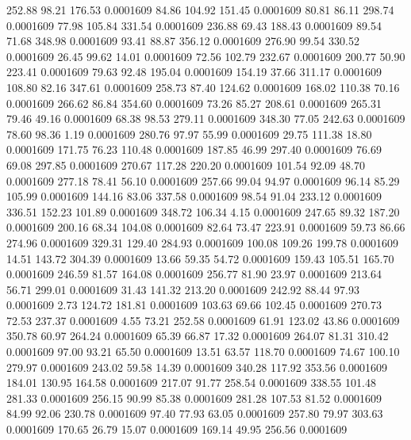  252.88   98.21  176.53   0.0001609
  84.86  104.92  151.45   0.0001609
  80.81   86.11  298.74   0.0001609
  77.98  105.84  331.54   0.0001609
 236.88   69.43  188.43   0.0001609
  89.54   71.68  348.98   0.0001609
  93.41   88.87  356.12   0.0001609
 276.90   99.54  330.52   0.0001609
  26.45   99.62   14.01   0.0001609
  72.56  102.79  232.67   0.0001609
 200.77   50.90  223.41   0.0001609
  79.63   92.48  195.04   0.0001609
 154.19   37.66  311.17   0.0001609
 108.80   82.16  347.61   0.0001609
 258.73   87.40  124.62   0.0001609
 168.02  110.38   70.16   0.0001609
 266.62   86.84  354.60   0.0001609
  73.26   85.27  208.61   0.0001609
 265.31   79.46   49.16   0.0001609
  68.38   98.53  279.11   0.0001609
 348.30   77.05  242.63   0.0001609
  78.60   98.36    1.19   0.0001609
 280.76   97.97   55.99   0.0001609
  29.75  111.38   18.80   0.0001609
 171.75   76.23  110.48   0.0001609
 187.85   46.99  297.40   0.0001609
  76.69   69.08  297.85   0.0001609
 270.67  117.28  220.20   0.0001609
 101.54   92.09   48.70   0.0001609
 277.18   78.41   56.10   0.0001609
 257.66   99.04   94.97   0.0001609
  96.14   85.29  105.99   0.0001609
 144.16   83.06  337.58   0.0001609
  98.54   91.04  233.12   0.0001609
 336.51  152.23  101.89   0.0001609
 348.72  106.34    4.15   0.0001609
 247.65   89.32  187.20   0.0001609
 200.16   68.34  104.08   0.0001609
  82.64   73.47  223.91   0.0001609
  59.73   86.66  274.96   0.0001609
 329.31  129.40  284.93   0.0001609
 100.08  109.26  199.78   0.0001609
  14.51  143.72  304.39   0.0001609
  13.66   59.35   54.72   0.0001609
 159.43  105.51  165.70   0.0001609
 246.59   81.57  164.08   0.0001609
 256.77   81.90   23.97   0.0001609
 213.64   56.71  299.01   0.0001609
  31.43  141.32  213.20   0.0001609
 242.92   88.44   97.93   0.0001609
   2.73  124.72  181.81   0.0001609
 103.63   69.66  102.45   0.0001609
 270.73   72.53  237.37   0.0001609
   4.55   73.21  252.58   0.0001609
  61.91  123.02   43.86   0.0001609
 350.78   60.97  264.24   0.0001609
  65.39   66.87   17.32   0.0001609
 264.07   81.31  310.42   0.0001609
  97.00   93.21   65.50   0.0001609
  13.51   63.57  118.70   0.0001609
  74.67  100.10  279.97   0.0001609
 243.02   59.58   14.39   0.0001609
 340.28  117.92  353.56   0.0001609
 184.01  130.95  164.58   0.0001609
 217.07   91.77  258.54   0.0001609
 338.55  101.48  281.33   0.0001609
 256.15   90.99   85.38   0.0001609
 281.28  107.53   81.52   0.0001609
  84.99   92.06  230.78   0.0001609
  97.40   77.93   63.05   0.0001609
 257.80   79.97  303.63   0.0001609
 170.65   26.79   15.07   0.0001609
 169.14   49.95  256.56   0.0001609
